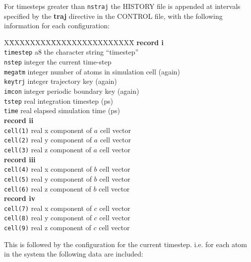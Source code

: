 For timesteps greater than {\tt nstraj} the HISTORY file is
appended at intervals specified by the {\bf traj} directive in the
CONTROL file, with the following information for each
configuration:
\begin{tabbing}
X\=XXXXXXXX\=XXXXXXXXXXXXXXXX\=\kill
{\bf record i} \\
\> {\tt timestep} \> a8      \> the character string ``timestep'' \\
\> {\tt nstep}    \> integer \> the current time-step \\
\> {\tt megatm}   \> integer \> number of atoms in simulation cell (again) \\
\> {\tt keytrj}   \> integer \> trajectory key (again) \\
\> {\tt imcon}    \> integer \> periodic boundary key (again) \\
\> {\tt tstep}    \> real    \> integration timestep (ps) \\
\> {\tt time}     \> real    \> elapsed simulation time (ps) \\
{\bf record ii} \\
\> {\tt cell(1)}  \> real    \> x component of $a$ cell vector \\
\> {\tt cell(2)}  \> real    \> y component of $a$ cell vector \\
\> {\tt cell(3)}  \> real    \> z component of $a$ cell vector \\
{\bf record iii} \\
\> {\tt cell(4)}  \> real    \> x component of $b$ cell vector \\
\> {\tt cell(5)}  \> real    \> y component of $b$ cell vector \\
\> {\tt cell(6)}  \> real    \> z component of $b$ cell vector \\
{\bf record iv} \\
\> {\tt cell(7)}  \> real    \> x component of $c$ cell vector \\
\> {\tt cell(8)}  \> real    \> y component of $c$ cell vector \\
\> {\tt cell(9)}  \> real    \> z component of $c$ cell vector \\
\end{tabbing}
This is followed by the configuration for the current timestep. i.e.
for each atom in the system the following data are included:
